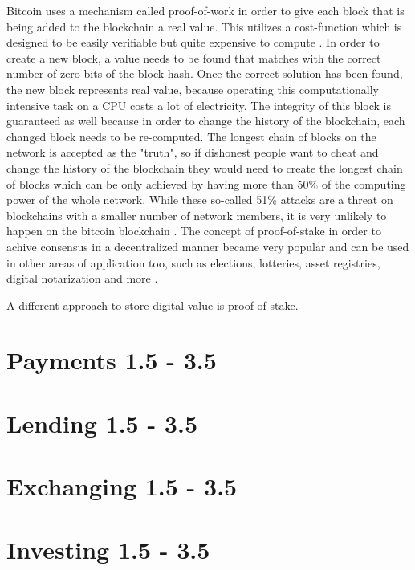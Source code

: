 Bitcoin uses a mechanism called proof-of-work in order to give each block that is being added to the blockchain a real value. This utilizes a cost-function which is designed to be easily verifiable but quite expensive to compute \cite{Back2002}. In order to create a new block, a value needs to be found that matches with the correct number of zero bits of the block hash. Once the correct solution has been found, the new block represents real value, because operating this computationally intensive task on a CPU costs a lot of electricity. The integrity of this block is guaranteed as well because in order to change the history of the blockchain, each changed block needs to be re-computed. The longest chain of blocks on the network is accepted as the "truth", so if dishonest people want to cheat and change the history of the blockchain they would need to create the longest chain of blocks which can be only achieved by having more than 50\% of the computing power of the whole network. While these so-called 51\% attacks are a threat on blockchains with a smaller number of network members, it is very unlikely to happen on the bitcoin blockchain \cite{Swan2015}. The concept of proof-of-stake in order to achive consensus in a decentralized manner became very popular and can be used in other areas of application too, such as elections, lotteries, asset registries, digital notarization and more \cite{Antonopoulos2017}.

A different approach to store digital value is proof-of-stake. \cite{AntonopoulosWood2018}

\section{Payments 1.5 - 3.5}
\section{Lending 1.5 - 3.5}
\section{Exchanging 1.5 - 3.5}
\section{Investing 1.5 - 3.5}